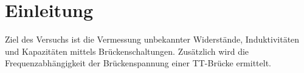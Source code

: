 \section{Einleitung}
\label{sec:Einleitung}
Ziel des Versuchs ist die Vermessung unbekannter Widerstände, Induktivitäten
und Kapazitäten mittels Brückenschaltungen. Zusätzlich wird die Frequenzabhängigkeit der
Brückenspannung einer TT-Brücke ermittelt.
